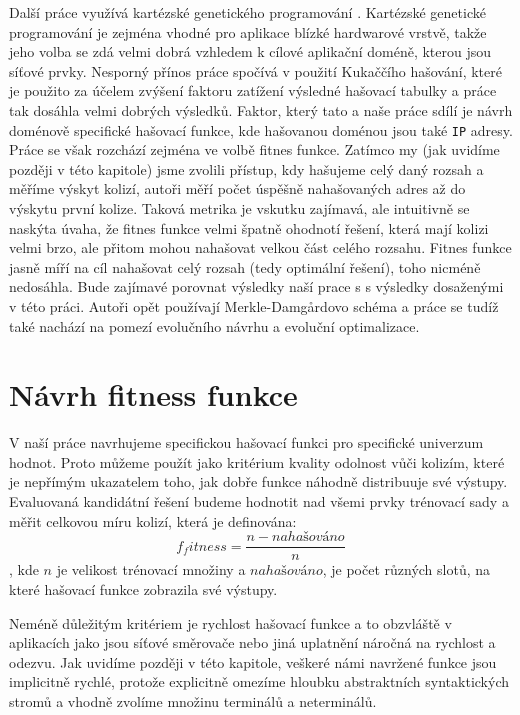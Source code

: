 Další práce využívá kartézské genetického programování \cite{dobai0}.
Kartézské genetické programování je zejména vhodné pro aplikace blízké
hardwarové vrstvě, takže jeho volba se zdá velmi dobrá vzhledem k cílové aplikační doméně,
kterou jsou síťové prvky. Nesporný přínos práce spočívá v použití Kukaččího hašování, které
je použito za účelem zvýšení faktoru zatížení výsledné hašovací tabulky a práce tak dosáhla velmi
dobrých výsledků. Faktor, který tato a naše práce sdílí je návrh doménově specifické hašovací 
funkce, kde hašovanou doménou jsou také \texttt{IP} adresy. Práce se však rozchází zejména ve volbě 
fitnes funkce. Zatímco my (jak uvidíme později v této kapitole) jsme zvolili přístup, kdy hašujeme
celý daný rozsah a měříme výskyt kolizí, autoři měří počet úspěšně nahašovaných adres až do výskytu
první kolize. Taková metrika je vskutku zajímavá, ale intuitivně se naskýta úvaha, že fitnes funkce
velmi špatně ohodnotí řešení, která mají kolizi velmi brzo, ale přitom mohou nahašovat velkou část
celého rozsahu. Fitnes funkce jasně míří na cíl nahašovat celý rozsah (tedy optimální řešení), toho
nicméně nedosáhla. Bude zajímavé porovnat výsledky naší prace s s výsledky dosaženými v této
práci. Autoři opět používají Merkle-Damg\r{a}rdovo schéma a práce se tudíž také nachází na 
pomezí evolučního návrhu a evoluční optimalizace.

\section{Návrh fitness funkce}

V naší práce navrhujeme specifickou
hašovací funkci pro specifické univerzum hodnot. Proto můžeme použít jako kritérium
kvality odolnost vůči kolizím, které je nepřímým ukazatelem toho, jak dobře funkce
náhodně distribuuje své výstupy. Evaluovaná kandidátní řešení
budeme hodnotit nad všemi prvky trénovací sady a měřit celkovou míru kolizí, která je definována:
$$f_fitness = \frac{n - nahašováno}{n}$$,
kde $n$ je velikost trénovací množiny a $nahašováno$, je počet různých slotů, na které hašovací
funkce zobrazila své výstupy.  

Neméně důležitým kritériem je rychlost hašovací funkce a to obzvláště v aplikacích jako jsou
síťové směrovače nebo jiná uplatnění náročná na rychlost a odezvu. Jak uvidíme později v této
kapitole, veškeré námi navržené funkce jsou implicitně rychlé, protože explicitně omezíme hloubku
abstraktních syntaktických stromů a vhodně zvolíme množinu terminálů a neterminálů. 

